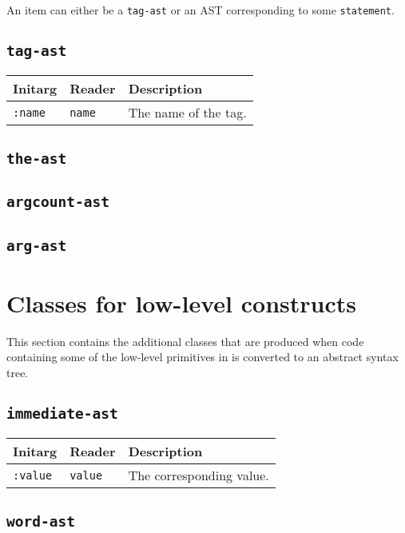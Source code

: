 An item can either be a \texttt{tag-ast} or an AST corresponding to
some \texttt{statement}. 

\subsection{\texttt{tag-ast}}

\begin{tabular}{|l|l|l|}
\hline
Initarg & Reader & Description\\
\hline\hline
\texttt{:name} & \texttt{name} & The name of the tag.\\
\hline
\end{tabular}

\subsection{\texttt{the-ast}}
\subsection{\texttt{argcount-ast}}
\subsection{\texttt{arg-ast}}

\section{Classes for low-level constructs}

This section contains the additional classes that are produced when 
code containing some of the low-level primitives in
 is converted to an abstract syntax
tree. 

\subsection{\texttt{immediate-ast}}

\begin{tabular}{|l|l|l|}
\hline
Initarg & Reader & Description\\
\hline\hline
\texttt{:value} & \texttt{value} & The corresponding value.\\
\hline
\end{tabular}

\subsection{\texttt{word-ast}}
